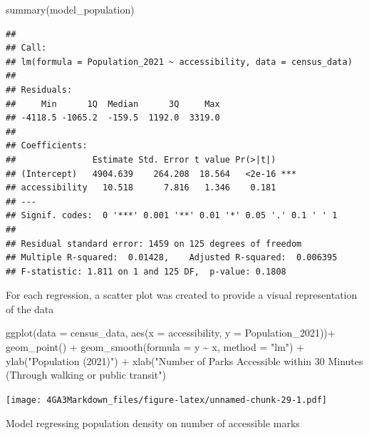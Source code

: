 \documentclass[
]{article}
\newenvironment{Shaded}{\begin{snugshade}}{\end{snugshade}}
\newcommand{\AttributeTok}[1]{\textcolor[rgb]{0.77,0.63,0.00}{#1}}
\newcommand{\FunctionTok}[1]{\textcolor[rgb]{0.00,0.00,0.00}{#1}}
\newcommand{\NormalTok}[1]{#1}
\newcommand{\SpecialCharTok}[1]{\textcolor[rgb]{0.00,0.00,0.00}{#1}}
\newcommand{\StringTok}[1]{\textcolor[rgb]{0.31,0.60,0.02}{#1}}
\begin{document}
\begin{Shaded}
\begin{Highlighting}[]
\FunctionTok{summary}\NormalTok{(model\_population)}
\end{Highlighting}
\end{Shaded}

\begin{verbatim}
## 
## Call:
## lm(formula = Population_2021 ~ accessibility, data = census_data)
## 
## Residuals:
##     Min      1Q  Median      3Q     Max 
## -4118.5 -1065.2  -159.5  1192.0  3319.0 
## 
## Coefficients:
##               Estimate Std. Error t value Pr(>|t|)    
## (Intercept)   4904.639    264.208  18.564   <2e-16 ***
## accessibility   10.518      7.816   1.346    0.181    
## ---
## Signif. codes:  0 '***' 0.001 '**' 0.01 '*' 0.05 '.' 0.1 ' ' 1
## 
## Residual standard error: 1459 on 125 degrees of freedom
## Multiple R-squared:  0.01428,    Adjusted R-squared:  0.006395 
## F-statistic: 1.811 on 1 and 125 DF,  p-value: 0.1808
\end{verbatim}

For each regression, a scatter plot was created to provide a visual
representation of the data

\begin{Shaded}
\begin{Highlighting}[]
\FunctionTok{ggplot}\NormalTok{(}\AttributeTok{data =}\NormalTok{ census\_data, }
       \FunctionTok{aes}\NormalTok{(}\AttributeTok{x =}\NormalTok{ accessibility, }
           \AttributeTok{y =}\NormalTok{ Population\_2021))}\SpecialCharTok{+}
  \FunctionTok{geom\_point}\NormalTok{() }\SpecialCharTok{+}
  \FunctionTok{geom\_smooth}\NormalTok{(}\AttributeTok{formula =}\NormalTok{ y }\SpecialCharTok{\textasciitilde{}}\NormalTok{ x,}
              \AttributeTok{method =} \StringTok{"lm"}\NormalTok{) }\SpecialCharTok{+}
  \FunctionTok{ylab}\NormalTok{(}\StringTok{"Population (2021)"}\NormalTok{) }\SpecialCharTok{+}
  \FunctionTok{xlab}\NormalTok{(}\StringTok{"Number of Parks Accessible within 30 Minutes (Through walking or public transit"}\NormalTok{) }
\end{Highlighting}
\end{Shaded}

\texttt{[image: 4GA3Markdown\_files/figure-latex/unnamed-chunk-29-1.pdf]}

Model regressing population density on number of accessible marks
\end{document}
